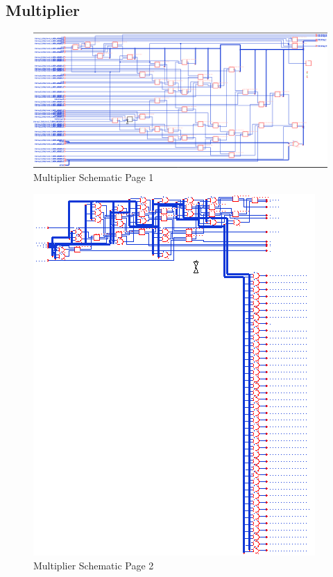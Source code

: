 \documentclass[11pt]{article}
\begin{document}
	\subsection{Multiplier}
	
		\begin{figure}[H] 
			\centering 
			\includegraphics[width=\textwidth,height=\dimexpr\textheight-4\baselineskip-\abovecaptionskip-\belowcaptionskip\relax,keepaspectratio]{"Pictures/Multiplier Schematic Page 1"}
			\caption{Multiplier Schematic Page 1} 
			\label{fig:Multiplier-Schematic-Page-1} 
		\end{figure}
		
		
		\begin{figure}[H] 
			\centering 
			\includegraphics[width=\textwidth,height=\dimexpr\textheight-4\baselineskip-\abovecaptionskip-\belowcaptionskip\relax,keepaspectratio]{"Pictures/Multiplier Schematic Page 2"}
			\caption{Multiplier Schematic Page 2} 
			\label{fig:Multiplier-Schematic-Page-2} 
		\end{figure}
	
\end{document}
